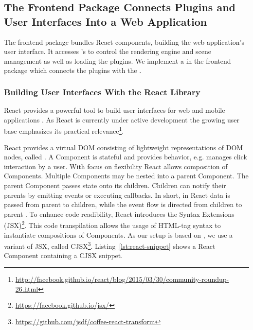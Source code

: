 \documentclass[../../ClassicThesis.tex]{subfiles}
\begin{document}
\subsection{The Frontend Package Connects Plugins and User Interfaces
  Into a Web Application}
\label{sec:client-to-application}





The frontend package bundles React components, building the web
application's user interface. It accesses {\convertify}'s
 to control the rendering engine and scene
management as well as loading the plugins. We implement a
 in the frontend package which connects the plugins
with the {\userinterface}.

\subsubsection{Building User Interfaces With the React Library}
\label{sec:ui-with-react}

React provides a powerful tool to build user interfaces for web and
mobile applications \cite{React13}. As React is currently under active
development the growing user base emphasizes its practical
relevance\footnote{\url{http://facebook.github.io/react/blog/2015/03/30/community-roundup-26.html}}.

React provides a virtual DOM consisting of lightweight representations
of DOM nodes, called  \cite{React13}. A Component is
stateful and provides behavior, e.g. manages click interaction by a
user. With focus on flexibility React allows composition of
Components. Multiple Components may be nested into a parent Component.
The parent Component passes state onto its children. Children can
notify their parents by emitting events or executing callbacks. In
short, in React data is passed from parent to children, while the
event flow is directed from children to parent
\cite{ReactDocComponents}. To enhance code readibility, React
introduces the {\javascript} Syntax Extensions
(JSX)\footnote{\url{https://facebook.github.io/jsx/}}. This code
transpilation allows the usage of HTML-tag syntax to instantiate
compositions of Components. As our setup is based on {\coffeescript},
we use a {\coffeescript} variant of JSX, called
CJSX\footnote{\url{https://github.com/jsdf/coffee-react-transform}}.
Listing~\ref{lst:react-snippet} shows a React Component containing a CJSX
snippet.
\end{document}
